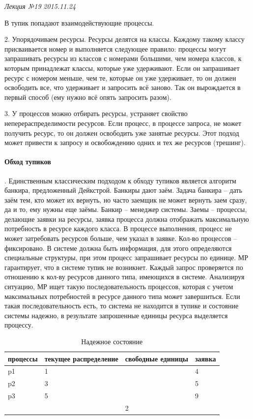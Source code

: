 \clearpage
\begin{flushright}
	\textit{Лекция №19}
	\textit{2015.11.24}
\end{flushright}

В тупик попадают взаимодействующие процессы.

2. Упорядочиваем ресурсы. Ресурсы делятся на классы. Каждому такому классу присваивается номер и выполняется следующее правило: процессы могут запрашивать ресурсы из классов с номерами большими, чем номера классов, к которым принадлежат классы, которые уже удерживают. Если он запрашивает ресурс с номером меньше, чем те, которые он уже удерживает, то он должен освободить все, что удерживает и запросить всё заново. Так он вырождается в первый способ (ему нужно всё опять запросить разом).

3. У процессов можно отбирать ресурсы, устраняет свойство неперераспределимости ресурсов. Если процесс, в процессе запроса, не может получить ресурс, то он должен освободить уже занятые ресурсы. Этот подход может привести к запросу и освобождению одних и тех же ресурсов (трешинг).

\paragraph{Обход тупиков}. Единственным классическим подходом к обходу тупиков является алгоритм банкира, предложенный Дейкстрой. Банкиры дают заём. Задача банкира – дать заём тем, кто может их вернуть, но часто заемщик не может вернуть заем сразу, да и то, ему нужны еще заёмы. Банкир – менеджер системы. Заемы – процессы, делающие заявки на ресурсы, заявка процесса должна отображать максимальную потребность в ресурсе каждого класса. В процессе выполнения, процесс не может затребовать ресурсов больше, чем указал в заявке. Кол-во процессов – фиксировано. В системе должна быть информация, для этого определяются специальные структуры, при этом процесс запрашивает ресурсы по единице. МР гарантирует, что в системе тупик не возникнет. Каждый запрос проверяется по отношению к кол-ву ресурсов данного типа, имеющихся в системе. Анализируя ситуацию, МР ищет такую последовательность процессов, которая с учетом максимальных потребностей в ресурсе данного типа может завершиться. Если такая последовательность есть, то система не находится в тупике и состояние системы надежно, в результате запрошенные единицы ресурса выделяется процессу.

\begin{table}[H]
\caption{Надежное состояние}
\label{tbl:norm_state}
\begin{tabular}{|l|l|l|l|}
\hline
процессы & текущее распределение & свободные единицы & заявка \\
\hline
p1 & 1 &  & 4\\
\hline
p2 & 3 &  & 5\\
\hline
p3 & 5 &  & 9\\
\hline
 &  & 2 & \\
 \hline
\end{tabular}
\end{table}

